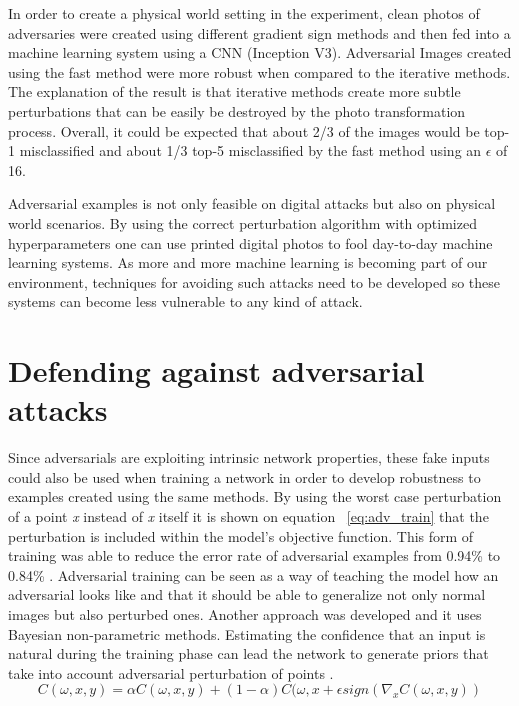 In order to create a physical world setting in the experiment, clean photos of adversaries were created using different gradient sign methods and then fed into a machine learning system using a CNN (Inception V3). Adversarial Images created using the fast method were more robust when compared to the iterative methods. The explanation of the result is that iterative methods create more subtle perturbations that can be easily be destroyed by the photo transformation process. Overall, it could be expected that about 2/3 of the images would be top-1 misclassified and about 1/3 top-5 misclassified by the fast method using an $\epsilon$ of 16.

Adversarial examples is not only feasible on digital attacks but also on physical world scenarios. By using the correct perturbation algorithm with optimized hyperparameters one can use printed digital photos to fool day-to-day machine learning systems. As more and more machine learning is becoming part of our environment, techniques for avoiding such attacks need to be developed so these systems can become less vulnerable to any kind of attack.

\section{Defending against adversarial attacks}\label{sec:robustness}

Since adversarials are exploiting intrinsic network properties, these fake inputs could also be used when training a network in order to develop robustness to examples created using the same methods. By using the worst case perturbation of a point \textit{x} instead of \textit{x} itself it is shown on equation ~\ref{eq:adv_train} that the perturbation is included within the model's objective function. This form of training was able to reduce the error rate of adversarial examples from 0.94\% to 0.84\% \cite{goodfellow2014}. Adversarial training can be seen as a way of teaching the model how an adversarial looks like and that it should be able to generalize not only normal images but also perturbed ones. Another approach was developed and it uses Bayesian non-parametric methods. Estimating the confidence that an input is natural during the training phase can lead the network to generate priors that take into account adversarial perturbation of points \cite{billovits}. 
\begin{equation} \label{eq:adv_train}
C(\omega,x,y) = \alpha C(\omega ,x,y) + (1-\alpha )C(\omega ,x+\epsilon sign(\nabla_{x}C(\omega,x,y))
\end{equation}

